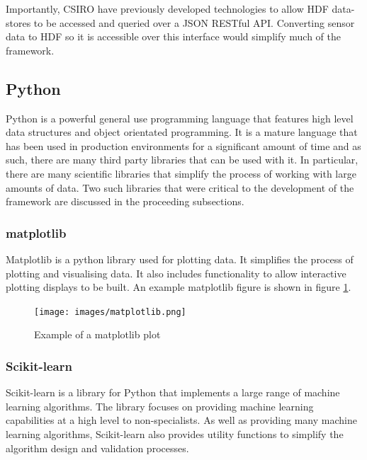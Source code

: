 Importantly, CSIRO have previously developed technologies to allow HDF data-stores to be accessed and queried over a JSON RESTful API. Converting sensor data to HDF so it is accessible over this interface would simplify much of the framework. 

\subsection{Python}
Python is a powerful general use programming language that features high level data structures and object orientated programming. \cite{van2003introduction} It is a mature language that has been used in production environments for a significant amount of time and as such, there are many third party libraries that can be used with it. In particular, there are many scientific libraries that simplify the process of working with large amounts of data. Two such libraries that were critical to the development of the framework are discussed in the proceeding subsections. 

\subsubsection{matplotlib}
Matplotlib is a python library used for plotting data. \cite{hunter2007matplotlib} It simplifies the process of plotting and visualising data. It also includes functionality to allow interactive plotting displays to be built. An example matplotlib figure is shown in figure \ref{matplotlib}.

\begin{figure}[ht!]
\begin{center}
\leavevmode
\texttt{[image: images/matplotlib.png]}
\end{center}
\caption{Example of a matplotlib plot}
\label{matplotlib}
\end{figure}

\subsubsection{Scikit-learn}

Scikit-learn is a library for Python that implements a large range of machine learning algorithms. The library focuses on providing machine learning capabilities at a high level to non-specialists. \cite{pedregosa2011scikit} As well as providing many machine learning algorithms, Scikit-learn also provides utility functions to simplify the algorithm design and validation processes. 

